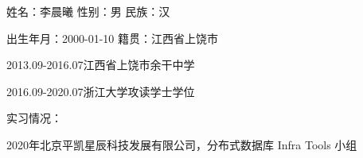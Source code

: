 \cleardoublepage


姓名：李晨曦 \quad 性别：男 \quad 民族：汉

出生年月：2000-01-10 \quad 籍贯：江西省上饶市

2013.09-2016.07\quad 江西省上饶市余干中学

2016.09-2020.07\quad 浙江大学攻读学士学位


实习情况：

2020年\quad 北京平凯星辰科技发展有限公司，分布式数据库 Infra Tools 小组
